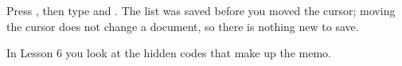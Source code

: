 \begin{WPSteps}[resume]
\item Press , then type  and .  The
list was saved before you moved the cursor; moving the cursor does not
change a document, so there is nothing new to save.
\end{WPSteps}
\EndReplay
In Lesson 6 you look at the hidden codes that make up the memo.
